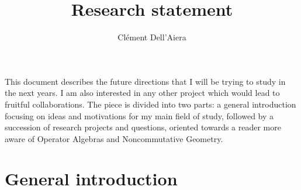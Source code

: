 \documentclass[a4paper]{article}
\title{Research statement}
\date{}
\author{ Cl\'ement Dell'Aiera}
\begin{document}
\maketitle

This document describes the future directions that I will be trying to study in the next years. I am also interested in any other project which would lead to fruitful collaborations. The piece is divided into two parts: a general introduction focusing on ideas and motivations for my main field of study, followed by a succession of research projects and questions, oriented towards a reader more aware of Operator Algebras and Noncommutative Geometry. 

\section{General introduction}




%
% 
\end{document}
